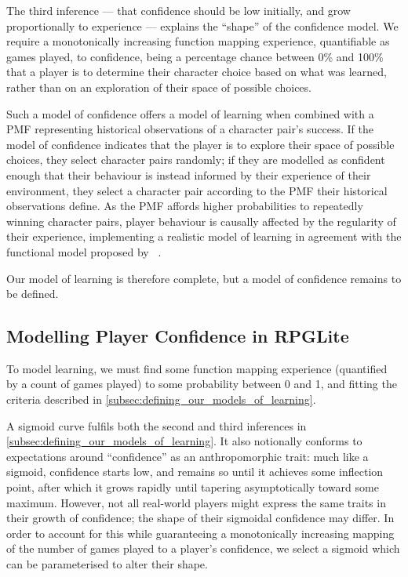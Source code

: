 The third inference --- that confidence should be low initially, and grow proportionally to experience ---
explains the ``shape'' of the confidence model. We require a monotonically increasing function mapping
experience, quantifiable as games played, to confidence, being a percentage chance between 0\% and 100\% that
a player is to determine their character choice based on what was learned, rather than on an exploration of
their space of possible choices.

Such a model of confidence offers a model of learning when combined with a PMF representing historical
observations of a character pair's success.
If the model of confidence indicates that the player is to explore their space of possible choices, they
select character pairs randomly; if they are modelled as confident enough that
their behaviour is instead informed by their experience of their environment,
they select a character pair according to the PMF their historical observations define.
As the PMF affords higher probabilities to repeatedly winning character pairs, player behaviour
is causally affected by the regularity of their experience, implementing a realistic model of learning
in agreement with the functional model proposed by \citeauthor{lachman1997learning}~\cite{lachman1997learning}.

Our model of learning is therefore complete, but a model of confidence remains to be defined.

\subsection{Modelling Player Confidence in RPGLite}\label{subsec:confidence_model}

To model learning, we must find some function mapping experience (quantified by a count of games played) to
some probability between 0 and 1, and fitting the criteria described in \cref{subsec:defining_our_models_of_learning}.

A sigmoid curve fulfils both the second and third inferences in \cref{subsec:defining_our_models_of_learning}.
It also notionally conforms to expectations
around ``confidence'' as an anthropomorphic trait: much like a sigmoid, confidence starts low, and remains so until
it achieves some inflection point, after which it grows rapidly until tapering asymptotically toward some maximum.
However, not all real-world players might express the same traits in their growth of confidence; the shape
of their sigmoidal confidence may differ. In order to account for this while guaranteeing a monotonically
increasing mapping of the number of games played to a player's confidence, we select a sigmoid which can
be parameterised to alter their shape.

